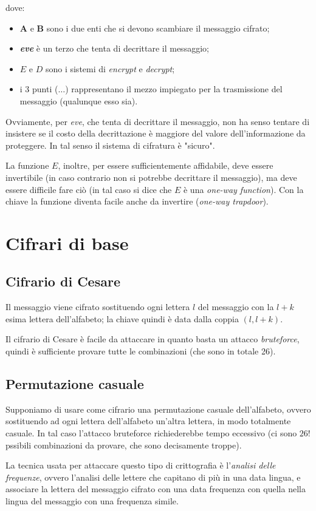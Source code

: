 \documentclass[a4paper, 11pt]{article}
\begin{document}
	dove:\begin{itemize}
		\item \textbf{A} e \textbf{B} sono i due enti che si devono scambiare il messaggio cifrato;
		\item \textbf{\textit{eve}} è un terzo che tenta di decrittare il messaggio;
		\item $E$ e $D$ sono i sistemi di \textit{encrypt} e \textit{decrypt};
		\item i 3 punti ($\dots$) rappresentano il mezzo impiegato per la trasmissione del messaggio (qualunque esso sia).
	\end{itemize}
	
	Ovviamente, per \textit{eve}, che tenta di decrittare il messaggio, non ha senso tentare di insistere se il costo della decrittazione è maggiore del valore dell'informazione da proteggere. In tal senso il sistema di cifratura è "sicuro". 
	
	La funzione $E$, inoltre, per essere sufficientemente affidabile, deve essere invertibile (in caso contrario non si potrebbe decrittare il messaggio), ma deve essere difficile fare ciò (in tal caso si dice che $E$ è una \textit{one-way function}). Con la chiave la funzione diventa facile anche da invertire (\textit{one-way trapdoor}).
	
	\section{Cifrari di base}
	\subsection{Cifrario di Cesare}
	Il messaggio viene cifrato sostituendo ogni lettera $l$ del messaggio con la $l+k$ esima lettera dell'alfabeto; la chiave quindi è data dalla coppia $(l, l+k)$. 
	
	Il cifrario di Cesare è facile da attaccare in quanto basta un attacco \textit{bruteforce}, quindi è sufficiente provare tutte le combinazioni (che sono in totale 26).
	
	\subsection{Permutazione casuale}
	Supponiamo di usare come cifrario una permutazione casuale dell'alfabeto, ovvero sostituendo ad ogni lettera dell'alfabeto un'altra lettera, in modo totalmente casuale. In tal caso l'attacco bruteforce richiederebbe tempo eccessivo (ci sono $26!$ pssibili combinazioni da provare, che sono decisamente troppe). 
	
	La tecnica usata per attaccare questo tipo di crittografia è l'\textit{analisi delle frequenze}, ovvero l'analisi delle lettere che capitano di più in una data lingua, e associare la lettera del messaggio cifrato con una data frequenza con quella nella lingua del messaggio con una frequenza simile.
	
	
	
	
	
\end{document}
